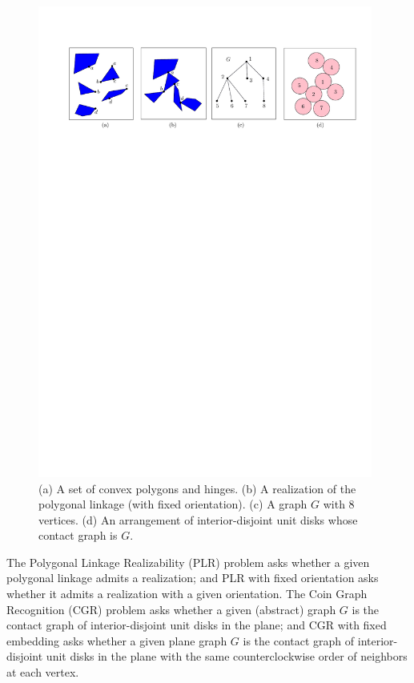 \documentclass{article}
\theoremstyle{plain}%
\begin{document}
\begin{figure}[htbp]
  \centering
 \includegraphics[width=0.98\textwidth]{fig1+}
\caption{(a) A set of convex polygons and hinges.
(b) A realization of the polygonal linkage (with fixed orientation).
(c) A graph $G$ with 8 vertices.
(d) An arrangement of interior-disjoint unit disks whose contact graph is $G$.}
\label{fig:1}
\end{figure}

The {\sc Polygonal Linkage Realizability (PLR)} problem asks whether a given polygonal linkage admits a realization; and {\sc PLR with fixed orientation} asks whether it admits a realization with a given orientation. The {\sc Coin Graph Recognition (CGR)} problem asks whether a given (abstract) graph $G$ is the contact graph of interior-disjoint unit disks in the plane; and {\sc CGR with fixed embedding} asks whether a given plane graph $G$ is the contact graph of interior-disjoint unit disks in the plane with the same counterclockwise order of neighbors at each vertex.
\end{document}
